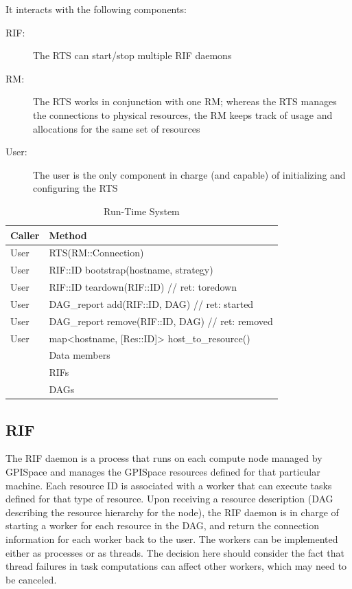 \documentclass[10pt]{article}
\newcommand{\user}{User\xspace}
\newcommand{\rts}{RTS\xspace}
\newcommand{\rman}{RM\xspace}
\newcommand{\rif}{RIF\xspace}
\newcommand{\rdag}{DAG\xspace}
\newcommand{\rdagrep}{DAG\_report\xspace}
\newcommand{\res}{Res\xspace}
\newcommand{\id}{::ID\xspace}
\newcommand{\conn}{::Connection\xspace}
\begin{document}
It interacts with the following components:
\begin{description}
    \item [\rif:] The \rts can start/stop multiple \rif daemons
    \item [\rman:] The \rts works in conjunction with one \rman; whereas the
    \rts manages the connections to physical resources, the \rman keeps track of
    usage and allocations for the same set of resources  
    \item [\user:] The user is the only component in charge (and capable) of
    initializing and configuring the \rts
\end{description}
%
\begin{table}[ht]
    \centering
    \caption{Run-Time System}
    \label{tab:rts}
    \bgroup
    \setlength{\tabcolsep}{2em}
    \begin{tabular}{ll}
        \toprule
        Caller & Method \\
        \midrule
        \user & \rts(\rman\conn) \\
        \user & \rif\id bootstrap(hostname, strategy) \\
        \user & \rif\id teardown(\rif\id)    // ret: toredown \\
        \user & \rdagrep add(\rif\id, \rdag) // ret: started \\
        \user & \rdagrep remove(\rif\id, \rdag) // ret: removed \\
        \user & map<hostname, [\res\id]> host\_to\_resource() \\
        \midrule
        & Data members \\        
        \midrule
        & RIFs \\
        & DAGs \\
        \bottomrule
    \end{tabular}
    \egroup
\end{table}
%

\subsection{RIF}

The \rif daemon is a process that runs on each compute node managed by GPISpace
and manages the GPISpace resources defined for that particular machine.
Each resource ID is associated with a worker that can execute tasks defined for
that type of resource.
Upon receiving a resource description (DAG describing the resource hierarchy for
the node), the \rif daemon is in charge of starting a worker for each resource
in the DAG, and return the connection information for each worker back to the
user. 
The workers can be implemented either as processes or as threads. The decision
here should consider the fact that thread failures in task computations can
affect other workers, which may need to be canceled.
\end{document}
